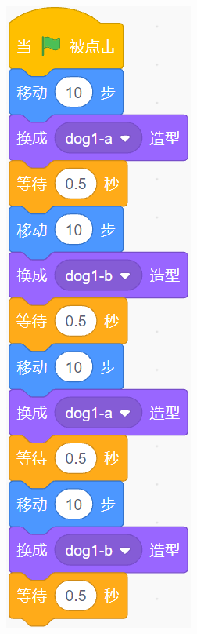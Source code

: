 \documentclass[10pt, a4paper]{article}
\begin{document}
\begin{enumerate}
\begin{figure}[htbp]
\begin{minipage}[t]{.23\textwidth}
\begin{minipage}[t]{.45\textwidth}
                \end{minipage}
                \begin{minipage}[t]{.45\textwidth}
                    \centering
                    \includegraphics[width=\textwidth]{27-2.png}

\end{minipage}
\end{minipage}
\end{figure}
\end{enumerate}
\end{document}
